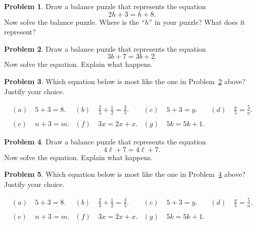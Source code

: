 \documentclass[12pt, reqno]{amsart}
\theoremstyle{remark}
\theoremstyle{definition}
\newtheorem{problem}{Problem}
\numberwithin{equation}{section}  %
\begin{document}
\bigskip


\begin{problem}
Draw a balance puzzle that represents the equation 
\[
2h + 3 = h + 8.
\]
 Now solve the balance puzzle. Where is the ``$h$'' in your puzzle?  What does it represent? 
\end{problem}

\bigskip


\begin{problem}\label{prob:no sol}
Draw a balance puzzle that represents the equation 
\[
3b + 7 = 3b + 2.
\]
 Now solve the equation. Explain what happens. 
 \end{problem}
 
 
\bigskip

\begin{problem}
Which equation below is most like the one in Problem~\ref{prob:no sol} above?  Justify your choice.

\begin{align*}
(a) &\ 5 + 3 = 8.
&
(b) &\ \frac 23 + \frac 12 = \frac 35.
&
(c) & \ 5 + 3 = y.
& (d)& \ 
\frac a 5 = \frac 5 a.
\\
\\
(e) & \ n + 3 = m.
&
(f) & \ 3x = 2x + x.
&
(g)& \ 
5k = 5k + 1.
\end{align*}

\end{problem}


\bigskip


\begin{problem}\label{prob:all sol}
Draw a balance puzzle that represents the equation 
\[
4\ell +7  = 4\ell + 7.
\]
 Now solve the equation. Explain what happens. 
 \end{problem}
 
 
\bigskip

\begin{problem}
Which equation below is most like the one in Problem~\ref{prob:all sol} above?  Justify your choice.

\begin{align*}
(a) &\ 5 + 3 = 8.
&
(b) &\ \frac 23 + \frac 12 = \frac 35.
&
(c) & \ 5 + 3 = y.
& (d)& \ 
\frac a 5 = \frac 5 a.
\\
\\
(e) & \ n + 3 = m.
&
(f) & \ 3x = 2x + x.
&
(g)& \ 
5k = 5k + 1.
\end{align*}

\end{problem}

\bigskip
\end{document}
